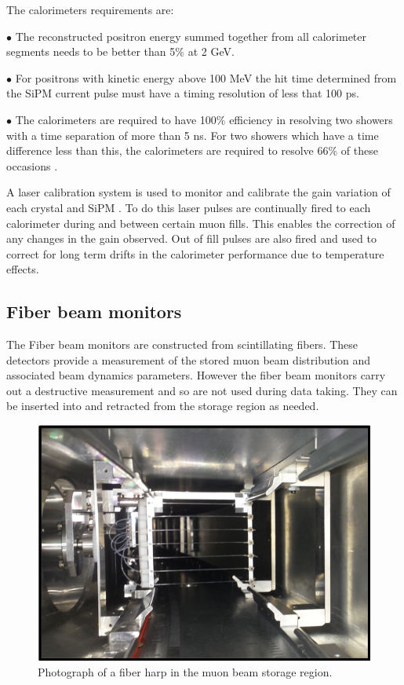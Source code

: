 The calorimeters requirements are:

$\bullet$ The reconstructed positron energy summed together from all calorimeter segments needs to be better than 5$\%$ at 2 GeV. 

$\bullet$ For positrons with kinetic energy above 100 MeV the hit time determined from the SiPM current pulse must have a timing resolution of less that 100 ps.

$\bullet$ The calorimeters are required to have 100$\%$ efficiency in resolving two showers with a time separation of more than 5 ns. For two showers which have a time difference less than this, the calorimeters are required to resolve 66$\%$ of these occasions \cite{Reference22}.

A laser calibration system is used to monitor and calibrate the gain variation of each crystal and SiPM \cite{calref2}\cite{calref3}. To do this laser pulses are continually fired to each calorimeter during and between certain muon fills. This enables the correction of any changes in the gain observed. Out of fill pulses are also fired and used to correct for long term drifts in the calorimeter performance due to temperature effects.

\subsection{Fiber beam monitors}

The Fiber beam monitors are constructed from scintillating fibers. These detectors provide a measurement of the stored muon beam distribution and associated beam dynamics parameters. However the fiber beam monitors carry out a destructive measurement and so are not used during data taking. They can be inserted into and retracted from the storage region as needed.
\begin{figure}[th]
\centering
\includegraphics[scale=1.2]{Figures/fiberharpphoto}
\decoRule
\caption{Photograph of a fiber harp in the muon beam storage region.}
\label{fig:fiberharpphoto}
\end{figure}

